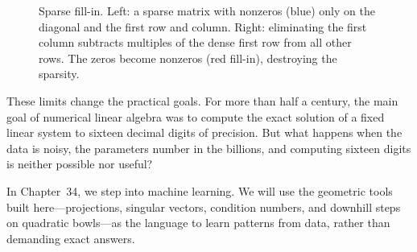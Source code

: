 \begin{figure}[htbp]
\centering
{}
\caption{Sparse fill-in. Left: a sparse matrix with nonzeros (blue) only on the diagonal and the first row and column. Right: eliminating the first column subtracts multiples of the dense first row from all other rows. The zeros become nonzeros (red fill-in), destroying the sparsity.}
\label{ch33:fillin}
\end{figure}

These limits change the practical goals. For more than half a
century, the main goal of numerical linear algebra was to compute the exact solution
of a fixed linear system to sixteen decimal digits of precision. But what happens when the
data is noisy, the parameters number in the billions, and computing sixteen digits is
neither possible nor useful?

In Chapter~34, we step into machine learning. We will use the geometric tools built
here---projections, singular vectors, condition numbers, and downhill steps on
quadratic bowls---as the language to learn patterns from data, rather than demanding exact answers.

